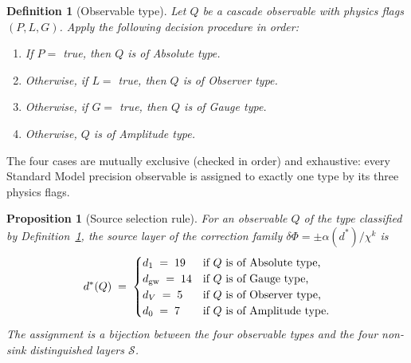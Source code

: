 \documentclass[12pt,a4paper]{article}
\newtheorem{proposition}[theorem]{Proposition}
\newtheorem{definition}[theorem]{Definition}
\begin{document}
\begin{definition}[Observable type]\label{def:observable-type}
Let $Q$ be a cascade observable with physics flags $(P,L,G)$. Apply the following decision procedure in order:
\begin{enumerate}
\item If $P=$ true, then $Q$ is of \emph{Absolute} type.
\item Otherwise, if $L=$ true, then $Q$ is of \emph{Observer} type.
\item Otherwise, if $G=$ true, then $Q$ is of \emph{Gauge} type.
\item Otherwise, $Q$ is of \emph{Amplitude} type.
\end{enumerate}
\end{definition}

The four cases are mutually exclusive (checked in order) and exhaustive: every Standard Model precision observable is assigned to exactly one type by its three physics flags.

\begin{proposition}[Source selection rule]\label{prop:source-selection}
For an observable $Q$ of the type classified by Definition~\ref{def:observable-type}, the source layer of the correction family $\delta\Phi=\pm\alpha(d^*)/\chi^k$ is
\[
d^*(Q) \;=\; \begin{cases}
d_1 \;=\; 19 & \text{if $Q$ is of Absolute type,}\\
d_{\rm gw}\;=\;14 & \text{if $Q$ is of Gauge type,}\\
d_V\;=\;5 & \text{if $Q$ is of Observer type,}\\
d_0\;=\;7 & \text{if $Q$ is of Amplitude type.}
\end{cases}
\]
The assignment is a bijection between the four observable types and the four non-sink distinguished layers $\mathcal{S}$.
\end{proposition}
\end{document}
